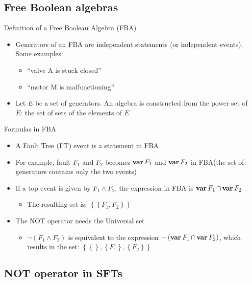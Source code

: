 \documentclass{beamer}
\def\FT{%
	Fault Tree (FT)%
	\gdef\FT{FT\xspace}%
	\gdef\FTs{FTs\xspace}%
	\gdef\IFT{An FT\xspace}%
	\xspace%
}
\def\FTs{%
	Fault Trees (FTs)%
	\gdef\FT{FT\xspace}%
	\gdef\FTs{FTs\xspace}%
	\gdef\IFT{An FT\xspace}%
	\xspace%
}
\def\IFT{%
	A Fault Tree (FT)%
	\gdef\FT{FT\xspace}%
	\gdef\FTs{FTs\xspace}%
	\gdef\IFT{An FT\xspace}%
	\xspace%
}
\def\FBA{%
	Free Boolean Algebra (FBA)%
	\gdef\FBA{FBA\xspace}%
	\gdef\FBAs{FBAs\xspace}%
	\gdef\iFBA{an FBA\xspace}%
	\xspace%
}
\def\FBAs{%
	Free Boolean Algebras (FBAs)%
	\gdef\FBA{FBA\xspace}%
	\gdef\FBAs{FBAs\xspace}%
	\gdef\iFBA{an FBA\xspace}%
	\xspace%
}
\def\iFBA{%
	a Free Boolean Algebra (FBA)%
	\gdef\FBA{FBA\xspace}%
	\gdef\FBAs{FBAs\xspace}%
	\gdef\iFBA{an FBA\xspace}%
	\xspace%
}
\def\varop{\ensuremath\operatorname{\mathbf{var}}}
\newcommand{\var}[1]{\ensuremath\varop #1}
\def\inter{\ensuremath\operatorname{\cap}}
\begin{document}
\subsection{Free Boolean algebras}

\begin{frame}[label=fba]{Definition of \iFBA}
	\begin{itemize}
		\item Generators of \iFBA are independent statements (or independent events). Some examples:
		\begin{itemize}
			\item ``valve A is stuck closed''
			\item ``motor M is malfunctioning''
		\end{itemize}
		\item Let $E$ be a set of generators. An algebra is constructed from the power set of $E$: the set of sets of the elements of $E$
	\end{itemize}
	\hyperlink{fbadef}{}
\end{frame}

\begin{frame}{Formulas in \FBA}
	\begin{itemize}
		\item \IFT event is a statement in \FBA
		\item For example, fault $F_1$ and $F_2$ becomes $\var F_1$ and $\var F_2$ in \FBA (the set of generators contains only the two events)
		\item If a top event is given by $F_1 \land F_2$, the expression in \FBA is $\var F_1 \inter \var F_2$
		\begin{itemize}
			\item The resulting set is: 
			$\left\{
				\left\{F_1, F_2\right\}
			\right\}$
		\end{itemize}
		\item The NOT operator needs the Universal set
		\begin{itemize}
			\item $\lnot \left(F_1 \land F_2\right)$ is equivalent to the expression $- \left(\var F_1 \inter \var F_2\right)$, which results in the set:
			$\left\{
				\left\{\right\},
				\left\{F_1\right\},
				\left\{F_2\right\}
			\right\}$
		\end{itemize}
	\end{itemize}
\end{frame}

\subsection{NOT operator in SFTs}
\end{document}
